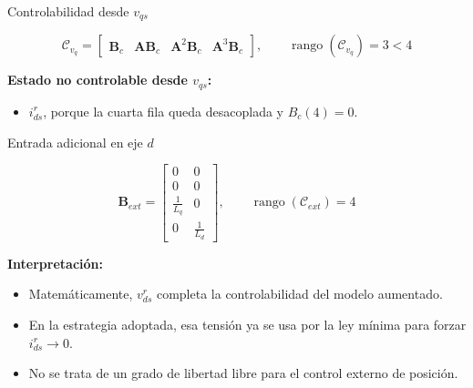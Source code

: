 \documentclass[aspectratio=169,t]{beamer}
\begin{document}
\begin{frame}{Controlabilidad desde $v_{qs}$}
\vspace{3mm}

\begin{equation*}
\mathcal{C}_{v_q}=
\begin{bmatrix}
\bm{B}_c & \bm{A}\bm{B}_c & \bm{A}^2\bm{B}_c & \bm{A}^3\bm{B}_c
\end{bmatrix},
\qquad
\operatorname{rango}(\mathcal{C}_{v_q})=3<4
\end{equation*}

\textbf{Estado no controlable desde $v_{qs}$:}
\begin{itemize}
  \item $i_{ds}^{r}$, porque la cuarta fila queda desacoplada y $B_c(4)=0$.
\end{itemize}
\end{frame}

\begin{frame}{Entrada adicional en eje $d$}
\vspace{2mm}

\begin{equation*}
\bm{B}_{ext}=
\begin{bmatrix}
0 & 0\\
0 & 0\\
\frac{1}{L_q} & 0\\
0 & \frac{1}{L_d}
\end{bmatrix},
\qquad
\operatorname{rango}(\mathcal{C}_{ext})=4
\end{equation*}

\textbf{Interpretación:}
\begin{itemize}
  \item Matemáticamente, $v_{ds}^{r}$ completa la controlabilidad del modelo aumentado.
  \item En la estrategia adoptada, esa tensión ya se usa por la ley mínima para forzar $i_{ds}^{r}\to0$.
  \item No se trata de un grado de libertad libre para el control externo de posición.
\end{itemize}
\end{frame}
\end{document}
